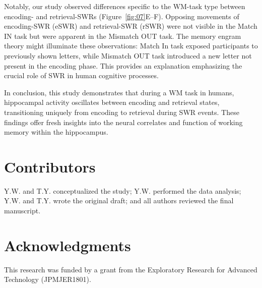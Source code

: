 \documentclass[final,3p,times,twocolumn]{elsarticle}
\begin{document}
Notably, our study observed differences specific to the WM-task type between encoding- and retrieval-SWRs (Figure~\ref{fig:07}E--F). Opposing movements of encoding-SWR (eSWR) and retrieval-SWR (rSWR) were not visible in the Match IN task but were apparent in the Mismatch OUT task. The memory engram theory \cite{liu_optogenetic_2012} might illuminate these observations: Match In task exposed participants to previously shown letters, while Mismatch OUT task introduced a new letter not present in the encoding phase. This provides an explanation emphasizing the crucial role of SWR in human cognitive processes.

In conclusion, this study demonstrates that during a WM task in humans, hippocampal activity oscillates between encoding and retrieval states, transitioning uniquely from encoding to retrieval during SWR events. These findings offer fresh insights into the neural correlates and function of working memory within the hippocampus.
\label{sec:discussion}





% 

% 




\section*{Contributors}
Y.W. and T.Y. conceptualized the study; Y.W. performed the data analysis; Y.W. and T.Y. wrote the original draft; and all authors reviewed the final manuscript.
\label{contributors}

\section*{Acknowledgments}
This research was funded by a grant from the Exploratory Research for Advanced Technology (JPMJER1801).
\label{acknowledgments}
\end{document}
